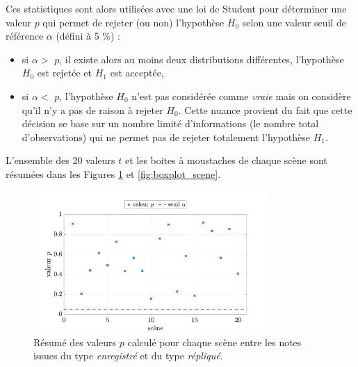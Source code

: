 Ces statistiques sont alors utilisées avec une loi de Student pour déterminer une valeur $p$ qui permet de rejeter (ou non) l'hypothèse $H_0$ selon une valeur seuil de référence $\alpha$ (défini à 5 $\%$) :  

\begin{itemize}
\item si $\alpha >$ $p$, il existe alors au moins deux distributions différentes, l'hypothèse $H_0$ est rejetée et $H_1$ est acceptée,
\item si $\alpha <$ $p$, l'hypothèse $H_0$ n'est pas considérée comme \textit{vraie} mais on considère qu'il n'y a pas de raison à rejeter $H_0$. Cette nuance provient du fait que cette décision se base sur un nombre limité d'informations (le nombre total d'observations) qui ne permet pas de rejeter totalement l'hypothèse $H_1$.\\
\end{itemize} 

L'ensemble des 20 valeurs $t$ et les boites à moustaches de chaque scène sont résumées dans les Figures  \ref{fig:test-student} et \ref{fig:boxplot_scene}.

\begin{figure}[ht]
\centering
\includegraphics[width = 0.8\textwidth]{./figures/test_perceptif/t-value-student.pdf}
\caption{Résumé des valeurs $p$ calculé pour chaque scène entre les notes issues du type \textit{enregistré} et du type \textit{répliqué}.}\label{fig:test-student}
\end{figure}

